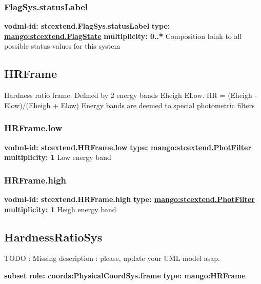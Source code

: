     \subsubsection{FlagSys.statusLabel}
      \textbf{vodml-id: stcextend.FlagSys.statusLabel} \newline
      \textbf{type: \hyperref[sect:stcextend.FlagState]{mango:stcextend.FlagState}} \newline
      \textbf{multiplicity: 0..*} \newline 
      Composition loink to all possible status values for this system

  \subsection{HRFrame}
  \label{sect:stcextend.HRFrame}
    Hardness ratio frame. Defined by 2 energy bands Eheigh ELow. HR = (Eheigh - Elow)/(Eheigh + Elow) Energy bands are deemed to special photometric filters

    \subsubsection{HRFrame.low}
      \textbf{vodml-id: stcextend.HRFrame.low} \newline
      \textbf{type: \hyperref[sect:stcextend.PhotFilter]{mango:stcextend.PhotFilter}} \newline
      \textbf{multiplicity: 1} \newline 
      Low energy band

    \subsubsection{HRFrame.high}
      \textbf{vodml-id: stcextend.HRFrame.high} \newline
      \textbf{type: \hyperref[sect:stcextend.PhotFilter]{mango:stcextend.PhotFilter}} \newline
      \textbf{multiplicity: 1} \newline 
      Heigh energy band
      
  \subsection{HardnessRatioSys}
  \label{sect:HardnessRatioSys}
    TODO : Missing description : please, update your UML model asap.

    \noindent \textbf{subset} \newline
    \indent   \textbf{role: coords:PhysicalCoordSys.frame} \newline
    \indent   \textbf{type: mango:HRFrame} \newline



